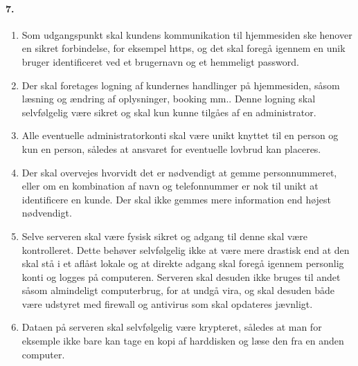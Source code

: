 \paragraph{7.}
\begin{enumerate}
\item Som udgangspunkt skal kundens kommunikation til hjemmesiden ske henover en
sikret forbindelse, for eksempel https, og det skal foregå igennem en unik
bruger identificeret ved et brugernavn og et hemmeligt password.
\item Der skal foretages logning af kundernes handlinger på hjemmesiden, såsom
læsning og ændring af oplysninger, booking mm.. Denne logning skal selvfølgelig
være sikret og skal kun kunne tilgåes af en administrator.
\item Alle eventuelle administratorkonti skal være unikt knyttet til en person
og kun en person, således at ansvaret for eventuelle lovbrud kan placeres.
\item Der skal overvejes hvorvidt det er nødvendigt at gemme personnummeret,
eller om en kombination af navn og telefonnummer er nok til unikt at identificere
en kunde. Der skal ikke gemmes mere information end højest nødvendigt.
\item Selve serveren skal være fysisk sikret og adgang til denne skal være kontrolleret.
Dette behøver selvfølgelig ikke at være mere drastisk end at den skal stå i et aflåst
lokale og at direkte adgang skal foregå igennem personlig konti og logges på computeren.
Serveren skal desuden ikke bruges til andet såsom almindeligt computerbrug, for at undgå vira,
og skal desuden både være udstyret med firewall og antivirus som skal opdateres jævnligt.
\item Dataen på serveren skal selvfølgelig være krypteret, således at man for eksemple ikke
bare kan tage en kopi af harddisken og læse den fra en anden computer.
\end{enumerate}

